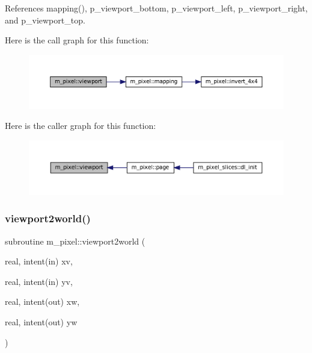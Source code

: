 References mapping(), p\+\_\+viewport\+\_\+bottom, p\+\_\+viewport\+\_\+left, p\+\_\+viewport\+\_\+right, and p\+\_\+viewport\+\_\+top.

Here is the call graph for this function\+:
\nopagebreak
\begin{figure}[H]
\begin{center}
\leavevmode
\includegraphics[width=350pt]{namespacem__pixel_a43247343cd316e3aa075b44b5166e2e9_cgraph}
\end{center}
\end{figure}
Here is the caller graph for this function\+:
\nopagebreak
\begin{figure}[H]
\begin{center}
\leavevmode
\includegraphics[width=350pt]{namespacem__pixel_a43247343cd316e3aa075b44b5166e2e9_icgraph}
\end{center}
\end{figure}
\mbox{\label{namespacem__pixel_a9e23c9a3a5f3b1482986f067fbf8487f}} 
\subsubsection{\texorpdfstring{viewport2world()}{viewport2world()}}
{\footnotesize\ttfamily subroutine m\+\_\+pixel\+::viewport2world (\begin{DoxyParamCaption}\item[{real, intent(in)}]{xv,  }\item[{real, intent(in)}]{yv,  }\item[{real, intent(out)}]{xw,  }\item[{real, intent(out)}]{yw }\end{DoxyParamCaption})\hspace{0.3cm}{\ttfamily [private]}}




